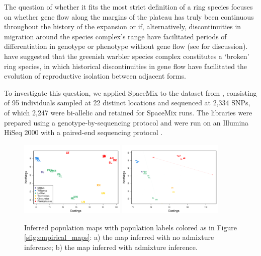 \documentclass[12pt]{article}
\begin{document}
The question of whether it fits the most strict definition of a ring species focuses on whether gene flow along the margins of the plateau has truly been continuous throughout the history of the expansion or if, alternatively, discontinuities in migration around the species complex's range have facilitated periods of differentiation in genotype or phenotype without gene flow \citep{Mayr1942, Mayr1970, coyne_orr_speciation} (see \citet{wake_schneider1998} for discussion). 
\citet{alcaide2014genomic} have suggested that the greenish warbler species complex constitutes a `broken' ring species, in which historical discontinuities in gene flow have facilitated the evolution of reproductive isolation between adjacent forms.  

To investigate this question, we applied SpaceMix to the dataset from \citet{alcaide2014genomic}, 
consisting of 95 individuals sampled at 22 distinct locations and sequenced at 2,334 SNPs, of which 2,247 were bi-allelic and retained for SpaceMix runs.
The libraries were prepared using a genotype-by-sequencing protocol and were run on an Illumina HiSeq 2000 with a paired-end sequencing protocol \citep{alcaide2014genomic}.

\begin{figure}
	\centering
			{\includegraphics[width=0.45\textwidth,height=0.375\textwidth]{figs/warblers/warb_pop_noad.pdf}}
			{\includegraphics[width=0.45\textwidth,height=0.375\textwidth]{figs/warblers/population_warbler_ad_map_randpr1.pdf}}
\caption{Inferred population maps with population labels colored as in Figure \ref{sfig:empirical_maps}: a) the map inferred with no admixture inference; b) the map inferred with admixture inference.}
\label{sfig:warbler_pop}
\end{figure}
\end{document}

